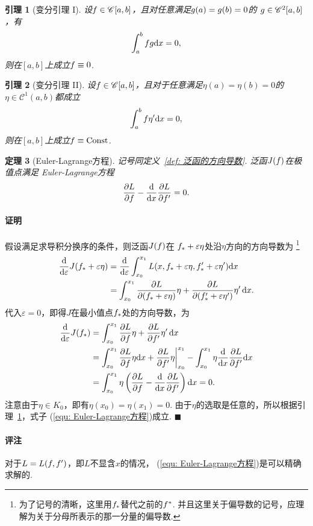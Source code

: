 \documentclass[12pt, a4paper]{article}
\theoremstyle{margin}
\newtheorem{thm}{定理}
\newtheorem{lemma}[thm]{引理}
\newcommand{\hp}{^\prime}
\newcommand{\ms}{\mathscr}
\newcommand{\f}{\mathnormal{f}}
\newcommand{\g}{\mathnormal{g}}
\newcommand{\rd}{\mathrm{d}}
\newcommand{\vep}{\varepsilon}
\newcommand\lemmaref[1]{引理~\ref{#1}}
\newcommand\defref[1]{定义~\ref{#1}}
\newcommand\equref[1]{(\ref{#1})}
\newcommand{\remark}{\paragraph{评注}}
\newcommand{\proof}{\paragraph{证明}}
\begin{document}
  \begin{lemma}[变分引理 I]
    \label{lemma: 变分引理}
    设$\f\in\ms{C}[a,b]$，且对任意满足$\g(a)=\g(b)=0$的
    $\g\in\ms{C}^2[a,b]$，有
    \[
      \int_{a}^{b}\f\g \rd x =0,
    \]
    则在$[a,b]$上成立$\f\equiv 0$.
  \end{lemma}

  \begin{lemma}[变分引理 II]
    设$\f\in\ms{C}[a, b]$，且对于任意满足$\eta(a) = \eta(b) = 0$的
    $\eta\in\ms{C}^1(a, b)$都成立
    \[
      \int_a^b\f\eta\hp\rd x = 0,
    \]
    则在$[a, b]$上成立$\f\equiv \text{Const}$.
  \end{lemma}

  \begin{thm}[Euler-Lagrange方程]
    \label{thm: Euler-Lagrange方程}
    记号同\defref{def: 泛函的方向导数}. 泛函$J(\f)$在极值点满足
    Euler-Lagrange方程
    \begin{equation}
      \label{equ: Euler-Lagrange方程}
      \frac{\partial L}{\partial\f} - \frac{\rd}{\rd x}\frac{\partial L}{\partial\f\hp} = 0.
    \end{equation}
  \end{thm}
  \proof
    假设满足求导积分换序的条件，则泛函$J(\f)$在
    $\f_*+\vep\eta$处沿$\eta$方向的方向导数为
    \footnote{为了记号的清晰，这里用$\f_*$替代之前的$\f^*$.
    并且这里关于偏导数的记号，应理解为关于分母所表示的那一分量的偏导数. }
    \[\begin{split}
      \frac{\rd}{\rd\vep}J(\f_*+\vep\eta) &=
      \frac{\rd}{\rd\vep}\int_{x_0}^{x_1}L(x,\f_*+\vep\eta,\f_*\hp+\vep\eta\hp)\rd x\\
      &= \int_{x_0}^{x_1} \frac{\partial L}{\partial (\f_*+\vep\eta)}\eta
      +\frac{\partial L}{\partial (\f_*\hp+\vep\eta\hp)}\eta\hp\,\rd x.
    \end{split}\]
    代入$\vep=0$，即得$J$在最小值点$\f_*$处的方向导数，为
    \[\begin{split}
      \frac{\rd}{\rd\vep}J(\f_*) &=
      \int_{x_0}^{x_1} \frac{\partial L}{\partial \f}\eta
      +\frac{\partial L}{\partial \f\hp}\eta\hp\,\rd x \\
      &= \int_{x_0}^{x_1} \frac{\partial L}{\partial\f}\eta\rd x
      + \frac{\partial L}{\partial\f\hp}\eta\bigg|_{x_0}^{x_1}
      - \int_{x_0}^{x_1}\eta\frac{\rd}{\rd x}\frac{\partial L}{\partial \f\hp}\rd x\\
      &= \int_{x_0}^{x_1} \eta\left( \frac{\partial L}{\partial\f}
      - \frac{\rd}{\rd x}\frac{\partial L}{\partial\f\hp} \right) \rd x = 0.
    \end{split}\]
    注意由于$\eta\in K_0$，即有$\eta(x_0) = \eta(x_1) = 0$.
    由于$\eta$的选取是任意的，所以根据\lemmaref{lemma: 变分引理}，式子
    \equref{equ: Euler-Lagrange方程}成立. $\blacksquare$
  \remark
    对于$L = L(\f,\f\hp)$，即$L$不显含$x$的情况，
    \equref{equ: Euler-Lagrange方程}是可以精确求解的.
\end{document}
